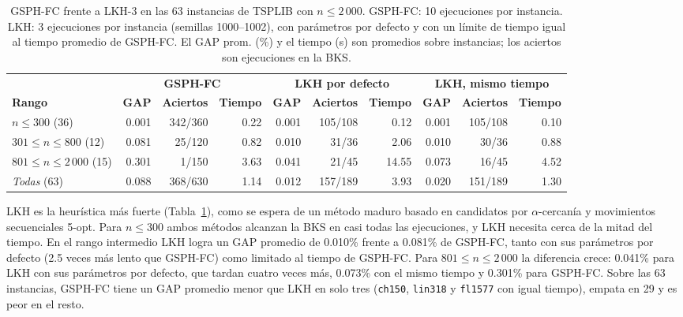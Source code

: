 \documentclass[runningheads]{llncs}
\begin{document}
\begin{table}
\caption{GSPH-FC frente a LKH-3 en las 63 instancias de TSPLIB con
$n\le 2\,000$. GSPH-FC: 10 ejecuciones por instancia. LKH: 3 ejecuciones
por instancia (semillas 1000--1002), con parámetros por defecto y con un
límite de tiempo igual al tiempo promedio de GSPH-FC. El GAP prom. (\%) y
el tiempo (s) son promedios sobre instancias; los aciertos son
ejecuciones en la BKS.}
\label{tab:lkh}
\centering\scriptsize
\begin{tabular}{@{}lrrrrrrrrr@{}}
\toprule
& \multicolumn{3}{c}{\textbf{GSPH-FC}} & \multicolumn{3}{c}{\textbf{LKH por defecto}} & \multicolumn{3}{c}{\textbf{LKH, mismo tiempo}}\\
\cmidrule(lr){2-4}\cmidrule(lr){5-7}\cmidrule(lr){8-10}
\textbf{Rango} & \textbf{GAP} & \textbf{Aciertos} & \textbf{Tiempo} & \textbf{GAP} & \textbf{Aciertos} & \textbf{Tiempo} & \textbf{GAP} & \textbf{Aciertos} & \textbf{Tiempo}\\
\midrule
$n\le 300$ (36)           & 0.001 & 342/360 & 0.22 & 0.001 & 105/108 &  0.12 & 0.001 & 105/108 & 0.10 \\
$301\le n\le 800$ (12)    & 0.081 &  25/120 & 0.82 & 0.010 &  31/36  &  2.06 & 0.010 &  30/36  & 0.88 \\
$801\le n\le 2\,000$ (15)& 0.301 &   1/150 & 3.63 & 0.041 &  21/45  & 14.55 & 0.073 &  16/45  & 4.52 \\
\midrule
\textit{Todas} (63)       & 0.088 & 368/630 & 1.14 & 0.012 & 157/189 &  3.93 & 0.020 & 151/189 & 1.30 \\
\bottomrule
\end{tabular}
\end{table}

LKH es la heurística más fuerte (Tabla~\ref{tab:lkh}), como se espera de
un método maduro basado en candidatos por $\alpha$-cercanía y
movimientos secuenciales 5-opt. Para $n\le 300$ ambos métodos alcanzan
la BKS en casi todas las ejecuciones, y LKH necesita cerca de la mitad
del tiempo. En el rango intermedio LKH logra un GAP promedio de 0.010\%
frente a 0.081\% de GSPH-FC, tanto con sus parámetros por defecto (2.5
veces más lento que GSPH-FC) como limitado al tiempo de GSPH-FC. Para
$801\le n\le 2\,000$ la diferencia crece: 0.041\% para LKH con sus
parámetros por defecto, que tardan cuatro veces más, 0.073\% con el mismo
tiempo y 0.301\% para GSPH-FC. Sobre las 63 instancias, GSPH-FC tiene un
GAP promedio menor que LKH en solo tres (\texttt{ch150}, \texttt{lin318}
y \texttt{fl1577} con igual tiempo), empata en 29 y es peor en el resto.
\end{document}
